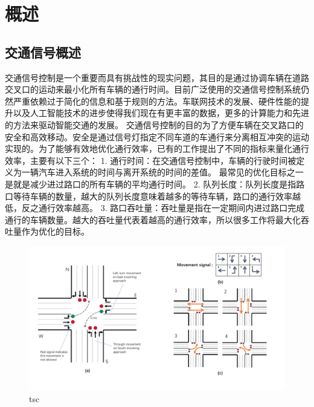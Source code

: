 
\chapter{概述}
\section{交通信号概述}
交通信号控制是一个重要而具有挑战性的现实问题，其目的是通过协调车辆在道路交叉口的运动来最小化所有车辆的通行时间。目前广泛使用的交通信号控制系统仍然严重依赖过于简化的信息和基于规则的方法。车联网技术的发展、硬件性能的提升以及人工智能技术的进步使得我们现在有更丰富的数据，更多的计算能力和先进的方法来驱动智能交通的发展。 
交通信号控制的目的为了方便车辆在交叉路口的安全和高效移动。安全是通过信号灯指定不同车道的车通行来分离相互冲突的运动实现的。为了能够有效地优化通行效率，已有的工作提出了不同的指标来量化通行效率，主要有以下三个：
1.	通行时间：在交通信号控制中，车辆的行驶时间被定义为一辆汽车进入系统的时间与离开系统的时间的差值。 最常见的优化目标之一是就是减少进过路口的所有车辆的平均通行时间。
2.	队列长度：队列长度是指路口等待车辆的数量，越大的队列长度意味着越多的等待车辆，路口的通行效率越低，反之通行效率越高。
3.	路口吞吐量：吞吐量是指在一定期间内进过路口完成通行的车辆数量。越大的吞吐量代表着越高的通行效率，所以很多工作将最大化吞吐量作为优化的目标。

\begin{figure}[htb]
    \includegraphics[width=.9\textwidth]{fig/tsc.pdf}
    \caption{tsc}
    \label{fig:tsc}
\end{figure}
